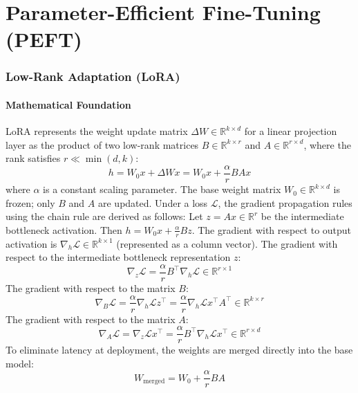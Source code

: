 \documentclass{article}
\begin{document}
\newpage
\part{Parameter-Efficient Fine-Tuning (PEFT)}

\section{Low-Rank Adaptation (LoRA)}

\subsection{Mathematical Foundation}
LoRA represents the weight update matrix $\Delta W \in \mathbb{R}^{k \times d}$ for a linear projection layer as the product of two low-rank matrices $B \in \mathbb{R}^{k \times r}$ and $A \in \mathbb{R}^{r \times d}$, where the rank satisfies $r \ll \min(d, k)$:
\begin{equation}
  h = W_0 x + \Delta W x = W_0 x + \frac{\alpha}{r} B A x
\end{equation}
where $\alpha$ is a constant scaling parameter. The base weight matrix $W_0 \in \mathbb{R}^{k \times d}$ is frozen; only $B$ and $A$ are updated. Under a loss $\mathcal{L}$, the gradient propagation rules using the chain rule are derived as follows:
Let $z = A x \in \mathbb{R}^r$ be the intermediate bottleneck activation. Then $h = W_0 x + \frac{\alpha}{r} B z$.
The gradient with respect to output activation is $\nabla_h \mathcal{L} \in \mathbb{R}^{k \times 1}$ (represented as a column vector).
The gradient with respect to the intermediate bottleneck representation $z$:
\begin{equation}
  \nabla_z \mathcal{L} = \frac{\alpha}{r} B^\top \nabla_h \mathcal{L} \in \mathbb{R}^{r \times 1}
\end{equation}
The gradient with respect to the matrix $B$:
\begin{equation}
  \nabla_B \mathcal{L} = \frac{\alpha}{r} \nabla_h \mathcal{L} z^\top = \frac{\alpha}{r} \nabla_h \mathcal{L} x^\top A^\top \in \mathbb{R}^{k \times r}
\end{equation}
The gradient with respect to the matrix $A$:
\begin{equation}
  \nabla_A \mathcal{L} = \nabla_z \mathcal{L} x^\top = \frac{\alpha}{r} B^\top \nabla_h \mathcal{L} x^\top \in \mathbb{R}^{r \times d}
\end{equation}
To eliminate latency at deployment, the weights are merged directly into the base model:
\begin{equation}
  W_{\text{merged}} = W_0 + \frac{\alpha}{r} B A
\end{equation}
\end{document}
